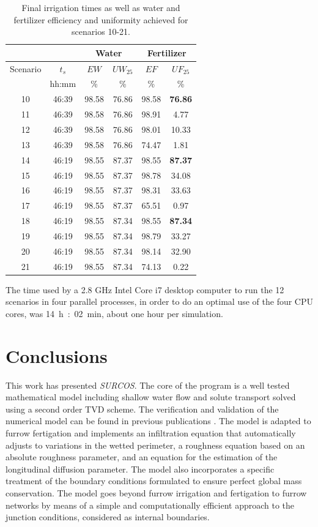 \documentclass[review,authoryear]{elsarticle}
\begin{document}
\begin{table}[ht!]
\centering
\caption{Final irrigation times as well as water and fertilizer
efficiency and uniformity achieved for scenarios 10-21.\label{TabFurrowNetwork}}
\footnotesize
\begin{tabular}{|c|c|cc|cc|}
\hline
&&\multicolumn{2}{|c|}{Water}&\multicolumn{2}{|c|}{Fertilizer}\\
\hline
Scenario&$t_s$&$EW$&$UW_{25}$&$EF$&$UF_{25}$\\
&hh:mm&\%&\%&\%&\%\\
\hline
10&46:39&98.58&76.86&98.58&\bf 76.86\\
11&46:39&98.58&76.86&98.91&4.77\\
12&46:39&98.58&76.86&98.01&10.33\\
13&46:39&98.58&76.86&74.47&1.81\\
14&46:19&98.55&87.37&98.55&\bf 87.37\\
15&46:19&98.55&87.37&98.78&34.08\\
16&46:19&98.55&87.37&98.31&33.63\\
17&46:19&98.55&87.37&65.51&0.97\\
18&46:19&98.55&87.34&98.55&\bf 87.34\\
19&46:19&98.55&87.34&98.79&33.27\\
20&46:19&98.55&87.34&98.14&32.90\\
21&46:19&98.55&87.34&74.13&0.22\\
\hline
\end{tabular}
\end{table}

The time used by a 2.8 GHz Intel Core i7 desktop computer to run the 12
scenarios in four parallel processes, in order to do an optimal use of the four
CPU cores, was 14~h~:~02~min, about one hour per simulation.

\section{Conclusions}

This work has presented \emph{SURCOS}. The core of the program is a well
tested mathematical model including shallow water flow and solute transport
solved using a second order TVD scheme. The verification and validation of the
numerical model can be found in previous publications
\citep{JaviSurcos1,JaviSurcos2}. The model is adapted to furrow fertigation and
implements an infiltration equation that automatically adjusts to variations in
the wetted perimeter, a roughness equation based on an absolute roughness
parameter, and an equation for the estimation of the longitudinal diffusion
parameter. The model also incorporates a specific treatment of the boundary
conditions formulated to ensure perfect global mass conservation. The model goes
beyond furrow irrigation and fertigation to furrow networks by means of a simple
and computationally efficient approach to the junction conditions, considered as
internal boundaries.
\end{document}
